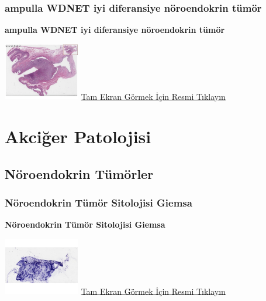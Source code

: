 \documentclass[
  letterpaper,
  DIV=11,
  numbers=noendperiod]{scrreprt}
\begin{document}
\hypertarget{sec-WDNET-ampulla}{%
\section{ampulla WDNET iyi diferansiye nöroendokrin
tümör}\label{sec-WDNET-ampulla}}

\textbf{ampulla WDNET iyi diferansiye nöroendokrin tümör}

\href{https://images.patolojiatlasi.com/WDNET-ampulla/HE.html}{\includegraphics[width=0.25\textwidth,height=\textheight]{./screenshots/WDNET-ampulla_screenshot.png}}
\href{https://images.patolojiatlasi.com/WDNET-ampulla/HE.html}{Tam Ekran
Görmek İçin Resmi Tıklayın}

\part{Akciğer Patolojisi}

\hypertarget{sec-noroendokrin-tumorler}{%
\chapter{Nöroendokrin Tümörler}\label{sec-noroendokrin-tumorler}}

\hypertarget{sec-noroendokrin-tumor-sitolojisi-giemsa}{%
\section{Nöroendokrin Tümör Sitolojisi
Giemsa}\label{sec-noroendokrin-tumor-sitolojisi-giemsa}}

\textbf{Nöroendokrin Tümör Sitolojisi Giemsa}

\href{https://images.patolojiatlasi.com/neuroendocrine-cytology/giemsa.html}{\includegraphics[width=0.25\textwidth,height=\textheight]{./screenshots/neuroendocrine-cytology-giemsa_screenshot.png}}
\href{https://images.patolojiatlasi.com/neuroendocrine-cytology/giemsa.html}{Tam
Ekran Görmek İçin Resmi Tıklayın}
\end{document}
